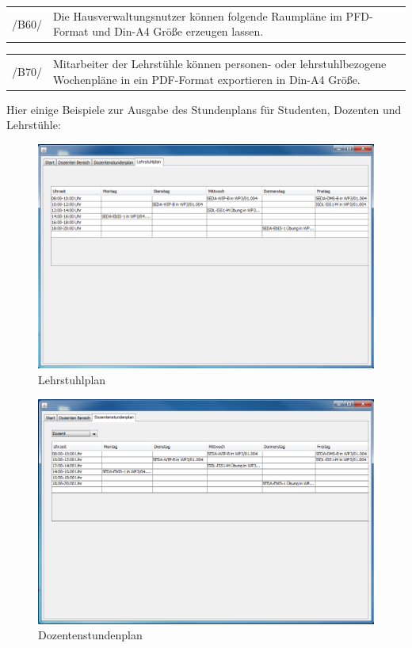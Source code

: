 \begin{tabular}{p{1.5cm}p{14.5cm}}
 /B60/	& Die Hausverwaltungsnutzer können folgende Raumpläne im PFD-Format und Din-A4 Größe erzeugen lassen. \\[0.25cm]	 
\end{tabular}

\begin{tabular}{p{1.5cm}p{14.5cm}}
 /B70/	& Mitarbeiter der Lehrstühle können personen- oder lehrstuhlbezogene Wochenpläne in ein PDF-Format exportieren in Din-A4 Größe. \\[0.25cm]	 
\end{tabular}

Hier einige Beispiele zur Ausgabe des Stundenplans für Studenten, Dozenten und Lehrstühle:
\begin{figure}[H]
\begin{center}
\includegraphics[width=120mm]{images/section_7/DozentenLehrstuhlplan.PNG}
\caption{Lehrstuhlplan}
\label{img:LehrstuhlplanDoz}
\end{center}
\end{figure}

\begin{figure}[H]
\begin{center}
\includegraphics[width=120mm]{images/section_7/DozentenStundenplan.PNG}
\caption{Dozentenstundenplan}
\label{img:StundenplanDoz}
\end{center}
\end{figure}

